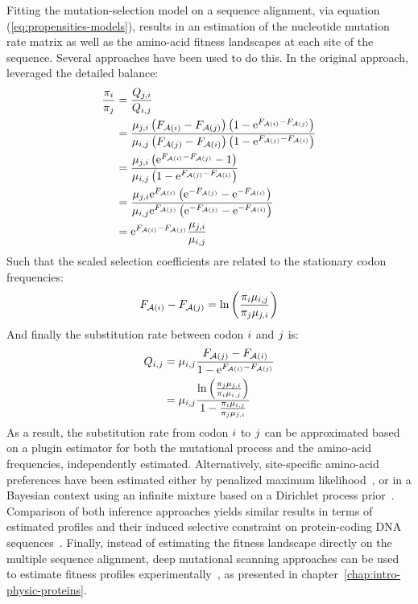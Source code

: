 Fitting the mutation-selection model on a sequence alignment, via equation (\ref{eq:propensities-models}), results in an estimation of the nucleotide mutation rate matrix as well as the amino-acid fitness landscapes at each site of the sequence.
Several approaches have been used to do this.
In the original approach, \citet{Halpern1998} leveraged the detailed balance:
\begin{align}
    \frac{\pi_{{i}}}{\pi_{{j}}} & = \frac{Q_{{j}, {i}}}{Q_{{i}, {j}}} \\
    & = \frac{\mu_{{j}, {i}} \left( F_{\mathcal{A}({i})} - F_{\mathcal{A}({j})} \right) \left(1 - \text{e}^{F_{\mathcal{A}({i})} - F_{\mathcal{A}({j})}} \right)}{\mu_{{i}, {j}}\left( F_{\mathcal{A}({j})} - F_{\mathcal{A}({i})} \right) \left(1 - \text{e}^{F_{\mathcal{A}({j})} - F_{\mathcal{A}({i})}} \right)} \\
    & =  \frac{\mu_{{j}, {i}} \left(\text{e}^{F_{\mathcal{A}({i})} - F_{\mathcal{A}({j})}} - 1 \right)}{\mu_{{i}, {j}} \left(1 - \text{e}^{F_{\mathcal{A}({j})} - F_{\mathcal{A}({i})}} \right)} \\
    & =  \frac{\mu_{{j}, {i}} \text{e}^{F_{\mathcal{A}({i})}} \left(\text{e}^{- F_{\mathcal{A}({j})}} - \text{e}^{- F_{\mathcal{A}({i})}} \right)}{\mu_{{i}, {j}}  \text{e}^{F_{\mathcal{A}({j})}} \left(\text{e}^{- F_{\mathcal{A}({j})}} - \text{e}^{- F_{\mathcal{A}({i})}} \right)} \\
    & =  \text{e}^{F_{\mathcal{A}({i})} - F_{\mathcal{A}({j})}} \frac{\mu_{{j}, {i}} }{\mu_{{i}, {j}}}
\end{align}
Such that the scaled selection coefficients are related to the stationary codon frequencies:
\begin{equation}
    F_{\mathcal{A}({i})} - F_{\mathcal{A}({j})} = \ln \left( \frac{\pi_{{i}} \mu_{{i}, {j}} }{\pi_{{j}} \mu_{{j}, {i}}} \right)
\end{equation}
And finally the substitution rate between codon ${i}$ and ${j}$ is:
\begin{align}
    Q_{{i}, {j}} & = \mu_{{i}, {j}} \dfrac{F_{\mathcal{A}({j})} - F_{\mathcal{A}({i})}}{1 - \text{e}^{F_{\mathcal{A}({i})} - F_{\mathcal{A}({j})}} } \\
    & = \mu_{{i}, {j}} \frac{ \ln \left( \frac{\pi_{{j}} \mu_{{j}, {i}}}{\pi_{{i}} \mu_{{i}, {j}} } \right) }{ 1 -  \frac{\pi_{{i}} \mu_{{i}, {j}} }{\pi_{{j}} \mu_{{j}, {i}}} }
\end{align}
As a result, the substitution rate from codon ${i}$ to ${j}$ can be approximated based on a plugin estimator for both the mutational process and the amino-acid frequencies, independently estimated.
Alternatively, site-specific amino-acid preferences have been estimated either by penalized maximum likelihood~\citep{Tamuri2012,Tamuri2014}, or in a Bayesian context using an infinite mixture based on a Dirichlet process prior~\citep{Rodrigue2010, Rodrigue2014}.
Comparison of both inference approaches yields similar results in terms of estimated profiles and their induced selective constraint on protein-coding \acrshort{DNA} sequences~\citep{Spielman2016a}.
Finally, instead of estimating the fitness landscape directly on the multiple sequence alignment, deep mutational scanning approaches can be used to estimate fitness profiles experimentally~\citep{Bloom2014,Bloom2014a}, as presented in chapter~\ref{chap:intro-physic-proteins}.

